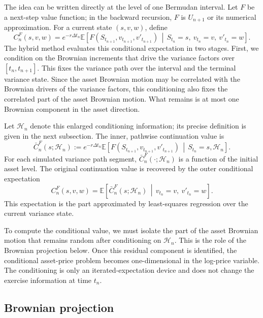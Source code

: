 \documentclass[pdflatex,sn-mathphys-num]{sn-jnl}
\theoremstyle{thmstyleone}%
\theoremstyle{thmstylethree}%
\theoremstyle{thmstyletwo}%
\newcommand{\E}{\mathbb E}
\begin{document}
The idea can be written directly at the level of one Bermudan interval. Let \(F\) be
a next-step value function; in the backward recursion, \(F\) is \(U_{n+1}\) or its
numerical approximation. For a current state \((s,v,w)\), define
\[
C_n^F(s,v,w)
=
e^{-r\Delta t_n}
\E\!\left[
F(S_{t_{n+1}},v_{t_{n+1}},v'_{t_{n+1}})
\,\middle|\,
S_{t_n}=s,\ v_{t_n}=v,\ v'_{t_n}=w
\right].
\]
The hybrid method evaluates this conditional expectation in two stages. First, we condition on the Brownian increments that drive the variance factors over
\([t_n,t_{n+1}]\). This fixes the variance path over the interval and the terminal
variance state. Since the asset Brownian motion may be correlated with the Brownian
drivers of the variance factors, this conditioning also fixes the correlated part of
the asset Brownian motion. What remains is at most one Brownian component in the
asset direction.

Let \(\mathcal H_n\) denote this enlarged conditioning information; its precise
definition is given in the next subsection. The inner, pathwise continuation value is
\[
\bar C_n^F(s;\mathcal H_n):=
e^{-r\Delta t_n}
\E\!\left[
F(S_{t_{n+1}},v_{t_{n+1}},v'_{t_{n+1}})
\,\middle|\,
S_{t_n}=s,\mathcal H_n
\right].
\]
For each simulated variance path segment, \(\bar C_n^F(\cdot;\mathcal H_n)\) is a
function of the initial asset level. The original continuation value is recovered by the outer conditional expectation
\[
C_n^F(s,v,w)
=
\E\!\left[
\bar C_n^F(s;\mathcal H_n)
\,\middle|\,
v_{t_n}=v,\ v'_{t_n}=w
\right].
\]
This expectation is the part approximated by least-squares regression over the current variance state.

To compute the conditional value, we must isolate the part of the asset Brownian motion that remains random after conditioning on \(\mathcal H_n\). This is the role of the Brownian projection below. Once this residual component is identified, the conditional asset-price problem becomes one-dimensional in the log-price variable. The conditioning is only an iterated-expectation device and does not change the exercise information at time \(t_n\).

\subsection{Brownian projection}
\end{document}
